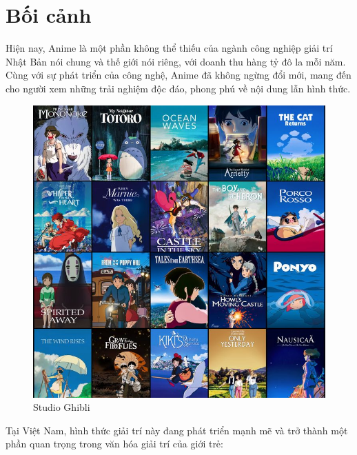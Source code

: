 \section{Bối cảnh}
\headindent Hiện nay, Anime là một phần không thể thiếu của ngành công nghiệp giải trí Nhật Bản nói chung và thế giới nói riêng, với doanh thu hàng tỷ đô la mỗi năm. Cùng với sự phát triển của công nghệ, Anime đã không ngừng đổi mới, mang đến cho người xem những trải nghiệm độc đáo, phong phú về nội dung lẫn hình thức.

\vspace{1cm}
\begin{figure}[H]
\centerline{\includegraphics[width=\linewidth, height=0.8\linewidth]{content/background/image/studio.jpg}}
\caption{Studio Ghibli}
\label{fig}
\end{figure}
\pagebreak
\headindent Tại Việt Nam, hình thức giải trí này đang phát triển mạnh mẽ và trở thành một phần quan trọng trong văn hóa giải trí của giới trẻ:
